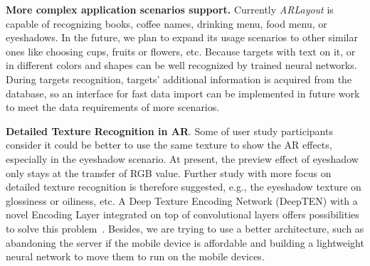 \textbf{More complex application scenarios support.} Currently \textit{ARLayout} is capable of recognizing books, coffee names,
drinking menu, food menu, or eyeshadows.
In the future, we plan to expand its usage scenarios to other similar ones like choosing cups, fruits or flowers, etc.
Because targets with text on it, or in different colors and shapes can be well recognized by trained neural networks.
During targets recognition, targets' additional information is acquired from the database,
so an interface for fast data import can be implemented
in future work to meet the data requirements of more scenarios.


\textbf{Detailed Texture Recognition in AR}. Some of user study participants
consider it could be better to use the same texture to show the AR effects,
especially in the eyeshadow scenario.
At present, the preview effect of eyeshadow only stays at the transfer of RGB value.
Further study with more focus on detailed texture recognition is therefore suggested,
e.g., the eyeshadow texture on glossiness or oiliness, etc.
A Deep Texture Encoding Network (DeepTEN) with a novel Encoding Layer
integrated on top of convolutional layers offers possibilities
to solve this problem~\cite{Zhang2017}.
Besides, we are trying to use a better architecture,
such as abandoning the server if the mobile device is affordable
and building a lightweight neural network to move them to run on the mobile devices.




